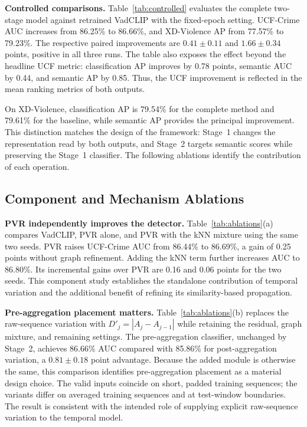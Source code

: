 \textbf{Controlled comparisons.}
Table~\ref{tab:controlled} evaluates the complete two-stage model against retrained VadCLIP with the fixed-epoch setting. UCF-Crime AUC increases from 86.25\% to 86.66\%, and XD-Violence AP from 77.57\% to 79.23\%. The respective paired improvements are $0.41\pm0.11$ and $1.66\pm0.34$ points, positive in all three runs. The table also exposes the effect beyond the headline UCF metric: classification AP improves by 0.78 points, semantic AUC by 0.44, and semantic AP by 0.85. Thus, the UCF improvement is reflected in the mean ranking metrics of both outputs.

On XD-Violence, classification AP is 79.54\% for the complete method and 79.61\% for the baseline, while semantic AP provides the principal improvement. This distinction matches the design of the framework: Stage~1 changes the representation read by both outputs, and Stage~2 targets semantic scores while preserving the Stage~1 classifier. The following ablations identify the contribution of each operation.



\subsection{Component and Mechanism Ablations}
\textbf{PVR independently improves the detector.}
Table~\ref{tab:ablations}(a) compares VadCLIP, PVR alone, and PVR with the kNN mixture using the same two seeds. PVR raises UCF-Crime AUC from 86.44\% to 86.69\%, a gain of 0.25 points without graph refinement. Adding the kNN term further increases AUC to 86.80\%. Its incremental gains over PVR are 0.16 and 0.06 points for the two seeds. This component study establishes the standalone contribution of temporal variation and the additional benefit of refining its similarity-based propagation.

\textbf{Pre-aggregation placement matters.}
Table~\ref{tab:ablations}(b) replaces the raw-sequence variation with $D'_j=|A_j-A_{j-1}|$ while retaining the residual, graph mixture, and remaining settings. The pre-aggregation classifier, unchanged by Stage~2, achieves 86.66\% AUC compared with 85.86\% for post-aggregation variation, a $0.81\pm0.18$ point advantage. Because the added module is otherwise the same, this comparison identifies pre-aggregation placement as a material design choice. The valid inputs coincide on short, padded training sequences; the variants differ on averaged training sequences and at test-window boundaries. The result is consistent with the intended role of supplying explicit raw-sequence variation to the temporal model.

